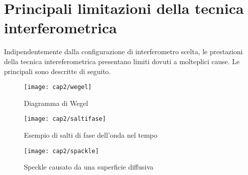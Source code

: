 \section{Principali limitazioni della tecnica interferometrica}
Indipendentemente dalla configurazione di interferometro scelta, le prestazioni della tecnica intereferometrica presentano limiti dovuti a molteplici cause. Le principali sono descritte di seguito.
\begin{figure}  
  \begin{center}
    \texttt{[image: cap2/wegel]}
    \caption{Diagramma di Wegel}
    \label{wegel}
  \end{center}
\end{figure}
\begin{figure}  
  \begin{center}
    \texttt{[image: cap2/saltifase]}
    \caption{Esempio di salti di fase dell'onda nel tempo}
    \label{saltifase}
  \end{center}
\end{figure}
\begin{figure}  
  \begin{center}
    \texttt{[image: cap2/spackle]}
    \caption{Speckle causato da una superficie diffusiva}
    \label{spackle}
  \end{center}
\end{figure}
